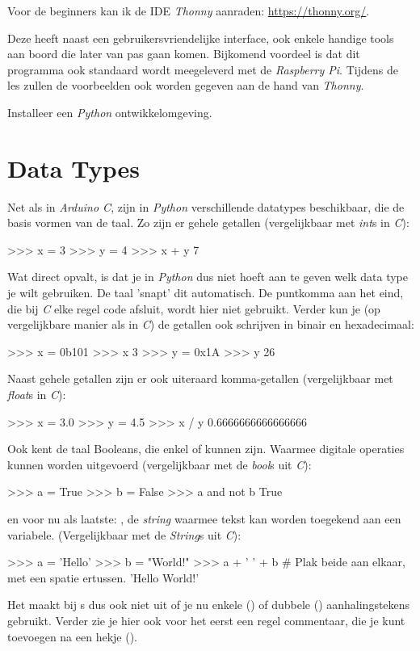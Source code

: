 Voor de beginners kan ik de IDE \textit{Thonny} aanraden: \url{https://thonny.org/}. \par 
Deze heeft naast een gebruikersvriendelijke interface, ook enkele handige tools aan boord die later van pas gaan komen. Bijkomend voordeel is dat dit programma ook standaard wordt meegeleverd met de \textit{Raspberry Pi}. Tijdens de les zullen de voorbeelden ook worden gegeven aan de hand van \textit{Thonny}.
\begin{exercise}
Installeer een \textit{Python} ontwikkelomgeving.
\end{exercise}

\section{Data Types}
Net als in \textit{Arduino C}, zijn in \textit{Python} verschillende datatypes beschikbaar, die de basis vormen van de taal. Zo zijn er gehele getallen (vergelijkbaar met \textit{int}s in \textit{C}):

\begin{python}
>>> x = 3
>>> y = 4
>>> x + y
7
\end{python}
Wat direct opvalt, is dat je in \textit{Python} dus niet hoeft aan te geven welk data type je wilt gebruiken. De taal 'snapt' dit automatisch. De puntkomma aan het eind, die bij \textit{C} elke regel code afsluit, wordt hier niet gebruikt. Verder kun je (op vergelijkbare manier als in \textit{C}) de getallen ook schrijven in binair en hexadecimaal:
\begin{python}
>>> x = 0b101
>>> x
3
>>> y = 0x1A
>>> y
26
\end{python}

Naast gehele getallen zijn er ook uiteraard komma-getallen (vergelijkbaar met \textit{float}s in \textit{C}):
\begin{python}
>>> x = 3.0
>>> y = 4.5
>>> x / y
0.6666666666666666
\end{python}

Ook kent de taal Booleans, die enkel  of  kunnen zijn. Waarmee digitale operaties kunnen worden uitgevoerd (vergelijkbaar met de \textit{bool}s uit \textit{C}):
\begin{python}
>>> a = True
>>> b = False
>>> a and not b
True
\end{python}

\newpage

en voor nu als laatste: , de \textit{string} waarmee tekst kan worden toegekend aan een variabele. (Vergelijkbaar met de \textit{String}s uit \textit{C}):
\begin{python}
>>> a = 'Hello'
>>> b = "World!"
>>> a + ' ' + b  # Plak beide aan elkaar, met een spatie ertussen.
'Hello World!'
\end{python}
Het maakt bij s dus ook niet uit of je nu enkele () of dubbele () aanhalingstekens gebruikt. Verder zie je hier ook voor het eerst een regel commentaar, die je kunt toevoegen na een hekje (\pyth{#}).

